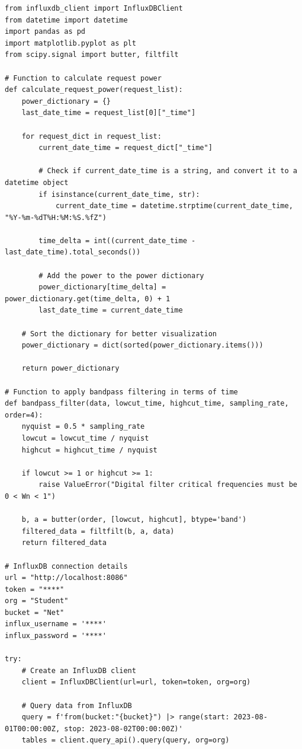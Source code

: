 \begin{lstlisting}
from influxdb_client import InfluxDBClient
from datetime import datetime
import pandas as pd
import matplotlib.pyplot as plt
from scipy.signal import butter, filtfilt

# Function to calculate request power
def calculate_request_power(request_list):
    power_dictionary = {}
    last_date_time = request_list[0]["_time"]

    for request_dict in request_list:
        current_date_time = request_dict["_time"]

        # Check if current_date_time is a string, and convert it to a datetime object
        if isinstance(current_date_time, str):
            current_date_time = datetime.strptime(current_date_time, "%Y-%m-%dT%H:%M:%S.%fZ")

        time_delta = int((current_date_time - last_date_time).total_seconds())

        # Add the power to the power dictionary
        power_dictionary[time_delta] = power_dictionary.get(time_delta, 0) + 1
        last_date_time = current_date_time

    # Sort the dictionary for better visualization
    power_dictionary = dict(sorted(power_dictionary.items()))

    return power_dictionary

# Function to apply bandpass filtering in terms of time
def bandpass_filter(data, lowcut_time, highcut_time, sampling_rate, order=4):
    nyquist = 0.5 * sampling_rate
    lowcut = lowcut_time / nyquist
    highcut = highcut_time / nyquist

    if lowcut >= 1 or highcut >= 1:
        raise ValueError("Digital filter critical frequencies must be 0 < Wn < 1")

    b, a = butter(order, [lowcut, highcut], btype='band')
    filtered_data = filtfilt(b, a, data)
    return filtered_data

# InfluxDB connection details
url = "http://localhost:8086"
token = "****"
org = "Student"
bucket = "Net"
influx_username = '****'
influx_password = '****'

try:
    # Create an InfluxDB client
    client = InfluxDBClient(url=url, token=token, org=org)

    # Query data from InfluxDB
    query = f'from(bucket:"{bucket}") |> range(start: 2023-08-01T00:00:00Z, stop: 2023-08-02T00:00:00Z)'
    tables = client.query_api().query(query, org=org)


\end{lstlisting}
